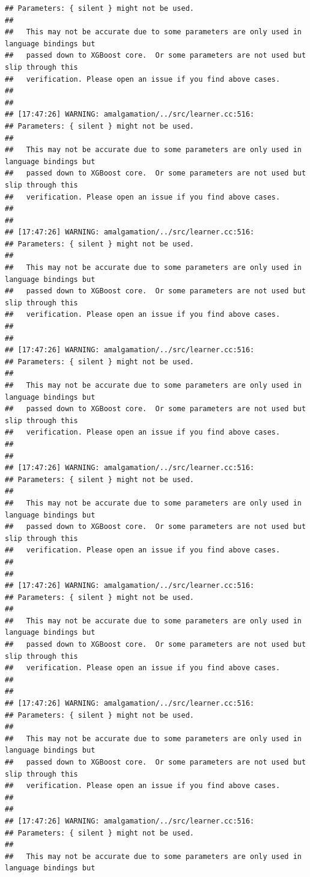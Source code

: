 \documentclass[AMS,STIX2COL]{WileyNJD-v2}\usepackage[]{graphicx}\usepackage[]{color}
\makeatletter
\newenvironment{kframe}{%
 \def\at@end@of@kframe{}%
 \ifinner\ifhmode%
  \def\at@end@of@kframe{\end{minipage}}%
  \begin{minipage}{\columnwidth}%
 \fi\fi%
 \def\FrameCommand##1{\hskip\@totalleftmargin \hskip-\fboxsep
 \colorbox{shadecolor}{##1}\hskip-\fboxsep
     \hskip-\linewidth \hskip-\@totalleftmargin \hskip\columnwidth}%
 \MakeFramed {\advance\hsize-\width
   \@totalleftmargin\z@ \linewidth\hsize
   \@setminipage}}%
 {\par\unskip\endMakeFramed%
 \at@end@of@kframe}
\newenvironment{knitrout}{}{} %
\makeatother
\begin{document}
\begin{knitrout}
\begin{kframe}
\begin{verbatim}
## Parameters: { silent } might not be used.
## 
##   This may not be accurate due to some parameters are only used in language bindings but
##   passed down to XGBoost core.  Or some parameters are not used but slip through this
##   verification. Please open an issue if you find above cases.
## 
## 
## [17:47:26] WARNING: amalgamation/../src/learner.cc:516: 
## Parameters: { silent } might not be used.
## 
##   This may not be accurate due to some parameters are only used in language bindings but
##   passed down to XGBoost core.  Or some parameters are not used but slip through this
##   verification. Please open an issue if you find above cases.
## 
## 
## [17:47:26] WARNING: amalgamation/../src/learner.cc:516: 
## Parameters: { silent } might not be used.
## 
##   This may not be accurate due to some parameters are only used in language bindings but
##   passed down to XGBoost core.  Or some parameters are not used but slip through this
##   verification. Please open an issue if you find above cases.
## 
## 
## [17:47:26] WARNING: amalgamation/../src/learner.cc:516: 
## Parameters: { silent } might not be used.
## 
##   This may not be accurate due to some parameters are only used in language bindings but
##   passed down to XGBoost core.  Or some parameters are not used but slip through this
##   verification. Please open an issue if you find above cases.
## 
## 
## [17:47:26] WARNING: amalgamation/../src/learner.cc:516: 
## Parameters: { silent } might not be used.
## 
##   This may not be accurate due to some parameters are only used in language bindings but
##   passed down to XGBoost core.  Or some parameters are not used but slip through this
##   verification. Please open an issue if you find above cases.
## 
## 
## [17:47:26] WARNING: amalgamation/../src/learner.cc:516: 
## Parameters: { silent } might not be used.
## 
##   This may not be accurate due to some parameters are only used in language bindings but
##   passed down to XGBoost core.  Or some parameters are not used but slip through this
##   verification. Please open an issue if you find above cases.
## 
## 
## [17:47:26] WARNING: amalgamation/../src/learner.cc:516: 
## Parameters: { silent } might not be used.
## 
##   This may not be accurate due to some parameters are only used in language bindings but
##   passed down to XGBoost core.  Or some parameters are not used but slip through this
##   verification. Please open an issue if you find above cases.
## 
## 
## [17:47:26] WARNING: amalgamation/../src/learner.cc:516: 
## Parameters: { silent } might not be used.
## 
##   This may not be accurate due to some parameters are only used in language bindings but

\end{verbatim}
\end{kframe}
\end{knitrout}
\end{document}
